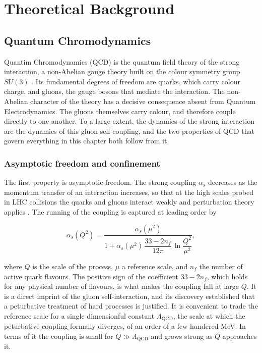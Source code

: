 \chapter{Theoretical Background}
\label{cap:estado-da-arte}

\section{Quantum Chromodynamics}
\label{sec:qcd}

Quantim Chromodynamics (QCD) is the quantum field theory of the strong interaction,
a non-Abelian gauge theory built on the colour symmetry group $SU(3)$ \cite{Ellis:1996mzs}.
Its fundamental degrees of freedom are quarks, which carry colour charge, and gluons,
the gauge bosons that mediate the interaction. The non-Abelian character of the theory
has a decisive consequence absent from Quantum Electrodynamics. The gluons themselves
carry colour, and therefore couple directly to one another. To a large extent, the
dynamics of the strong interaction are the dynamics of this gluon self-coupling, and
the two properties of QCD that govern everything in this chapter both follow from it.

\subsection{Asymptotic freedom and confinement}

The first property is asymptotic freedom. The strong coupling $\alpha_s$ decreases
as the momentum transfer of an interaction increases, so that at the high scales 
probed in LHC collisions the quarks and gluons interact weakly and perturbation
theory applies \cite{Gross:1973id,Politzer:1973fx}. The running of the coupling
is captured at leading order by

\begin{equation}
    \alpha_s(Q^2) = \frac{\alpha_s(\mu^2)}
    {1 + \alpha_s(\mu^2)\,\dfrac{33 - 2 n_f}{12\pi}\,\ln\!\dfrac{Q^2}{\mu^2}},
    \label{eq:running}
\end{equation}

where $Q$ is the scale of the process, $\mu$ a reference scale, and $n_f$ the
number of active quark flavours. The positive sign of the coefficient
$33 - 2n_f$, which holds for any physical number of flavours, is what makes the
coupling fall at large $Q$.  It is a direct imprint of the gluon self-interaction,
and its discovery established that a peturbative treatment of hard processes is
justified. It is convenient to trade the reference scale for a single dimensionful
constant $\Lambda_{\mathrm{QCD}}$, the scale at which the peturbative coupling formally
diverges, of an order of a few hundered MeV. In terms of it the coupling is small for
$Q \gg \Lambda_{\mathrm{QCD}}$ and grows strong as $Q$ approaches it.

